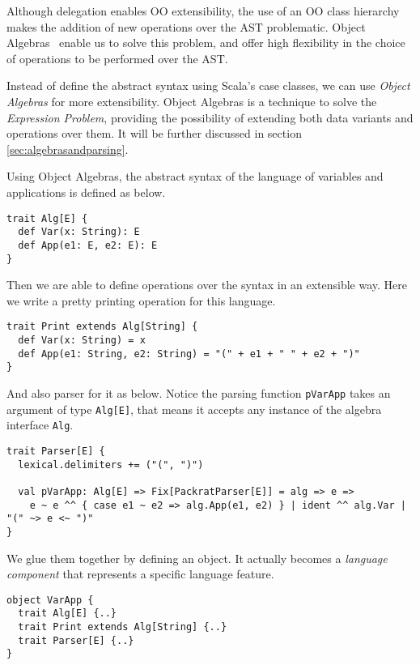 Although delegation enables OO extensibility, the use of an OO class
hierarchy makes the addition of new operations over the AST
problematic. Object Algebras~\cite{} enable us to solve this problem, and
offer high flexibility in the choice of operations to be performed
over the AST.


Instead of define the abstract syntax using Scala's case classes, we
can use \textit{Object Algebras} for more extensibility. Object
Algebras is a technique to solve the \textit{Expression Problem},
providing the possibility of extending both data variants and
operations over them. It will be further discussed in section
\ref{sec:algebrasandparsing}.

Using Object Algebras, the abstract syntax of the language of variables and applications is defined as below.

\begin{lstlisting}
trait Alg[E] {
  def Var(x: String): E
  def App(e1: E, e2: E): E
}
\end{lstlisting}

Then we are able to define operations over the syntax in an extensible way. Here we write a pretty printing operation for this language.

\begin{lstlisting}
trait Print extends Alg[String] {
  def Var(x: String) = x
  def App(e1: String, e2: String) = "(" + e1 + " " + e2 + ")"
}
\end{lstlisting}

And also parser for it as below. Notice the parsing function \lstinline{pVarApp} takes an argument of type \lstinline{Alg[E]}, that means it accepts any instance of the algebra interface \lstinline{Alg}.

\begin{lstlisting}
trait Parser[E] {
  lexical.delimiters += ("(", ")")

  val pVarApp: Alg[E] => Fix[PackratParser[E]] = alg => e =>
    e ~ e ^^ { case e1 ~ e2 => alg.App(e1, e2) } | ident ^^ alg.Var | "(" ~> e <~ ")"
}
\end{lstlisting}

We glue them together by defining an object. It actually becomes a \textit{language component} that represents a specific language feature.

\begin{lstlisting}
object VarApp {
  trait Alg[E] {..}
  trait Print extends Alg[String] {..}
  trait Parser[E] {..}
}
\end{lstlisting}

